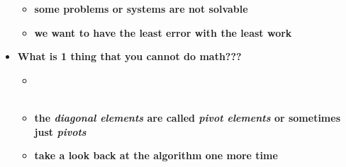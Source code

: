 \documentclass[11pt]{article}
\begin{document}
\begin{itemize}
\begin{itemize}
		\item \textbf{ some problems or systems are not solvable} \vspace{20mm}\\
		\item \textbf{ we want to have the least error with the least work}
	\end{itemize}
\newpage


\Large
\item \textbf{ What is 1 thing that you cannot do math???} \\

	\begin{itemize}
		\item {}\\\\

	\item \textbf{ the {\it diagonal elements} are called {\it pivot elements} or sometimes just {\it pivots}}\\
	\item \textbf{ take a look back at the algorithm one more time} \\\\
	 \\
	
		\hspace{10mm}  \\
		

\end{itemize}
\end{itemize}
\end{document}
